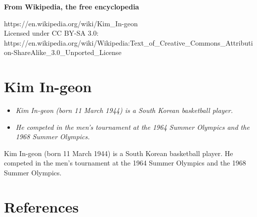 \textbf{From Wikipedia, the free encyclopedia}

https://en.wikipedia.org/wiki/Kim\_In-geon\\
Licensed under CC BY-SA 3.0:\\
https://en.wikipedia.org/wiki/Wikipedia:Text\_of\_Creative\_Commons\_Attribution-ShareAlike\_3.0\_Unported\_License

\section{Kim In-geon}\label{kim-in-geon}

\begin{itemize}
\item
  \emph{Kim In-geon (born 11 March 1944) is a South Korean basketball
  player.}
\item
  \emph{He competed in the men's tournament at the 1964 Summer Olympics
  and the 1968 Summer Olympics.}
\end{itemize}

Kim In-geon (born 11 March 1944) is a South Korean basketball player. He
competed in the men's tournament at the 1964 Summer Olympics and the
1968 Summer Olympics.

\section{References}\label{references}
